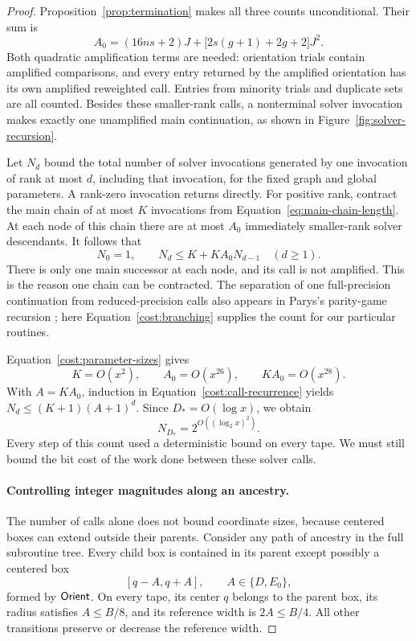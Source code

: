 \begin{proof}
Proposition~\ref{prop:termination} makes all three counts unconditional.
Their sum is
\begin{equation}\label{cost:branching}
 A_0=(16ns+2)J+\bigl[2s(g+1)+2g+2\bigr]J^2.
\end{equation}
Both quadratic amplification terms are needed: orientation trials
contain amplified comparisons, and every entry returned by the
amplified orientation has its own amplified reweighted call. Entries
from minority trials and duplicate sets are all counted. Besides
these smaller-rank calls, a nonterminal solver invocation makes
exactly one unamplified main continuation, as shown in
Figure~\ref{fig:solver-recursion}.



Let \(N_d\) bound the total number of solver invocations generated
by one invocation of rank at most \(d\), including that invocation,
for the fixed graph and global parameters. A rank-zero invocation
returns directly. For positive rank, contract the main chain of at
most \(K\) invocations from Equation~\eqref{eq:main-chain-length}.
At each node of this chain there are at most \(A_0\) immediately
smaller-rank solver descendants. It follows that
\begin{equation}\label{cost:call-recurrence}
 N_0=1,\qquad N_d\le K+KA_0N_{d-1}\quad(d\ge1).
\end{equation}
There is only one main successor at each node, and its call is not
amplified. This is the reason one chain can be contracted. The
separation of one full-precision continuation from reduced-precision
calls also appears in Parys's parity-game recursion
\cite[Algorithm~2 and Section~5]{Parys2019}; here
Equation~\eqref{cost:branching} supplies the count for our particular
routines.

Equation~\eqref{cost:parameter-sizes} gives
\[
       K=O(x^2),\qquad A_0=O(x^{26}),\qquad KA_0=O(x^{28}).
\]
With \(A=KA_0\), induction in
Equation~\eqref{cost:call-recurrence} yields
\(N_d\le(K+1)(A+1)^d\). Since
\(D_*=O(\log x)\), we obtain
\begin{equation}\label{cost:call-count}
                N_{D_*}=2^{O((\log_2 x)^2)}.
\end{equation}
Every step of this count used a deterministic bound on every tape.
We must still bound the bit cost of the work done between these
solver calls.

\paragraph{Controlling integer magnitudes along an ancestry.}
The number of calls alone does not bound coordinate sizes, because
centered boxes can extend outside their parents. Consider any path
of ancestry in the full subroutine tree. Every child box is contained
in its parent except possibly a centered box
\[
        [q-A,q+A],\qquad A\in\{D,E_0\},
\]
formed by \(\mathsf{Orient}\). On every tape, its center \(q\) belongs to
the parent box, its radius satisfies \(A\le B/8\), and its reference
width is \(2A\le B/4\). All other transitions preserve or decrease
the reference width.


\end{proof}
